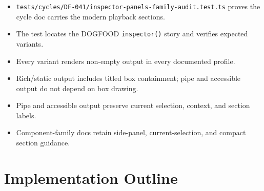 \begin{itemize}
\tightlist
\item
  \texttt{t\allowbreak{}e\allowbreak{}s\allowbreak{}t\allowbreak{}s\allowbreak{}/\allowbreak{}c\allowbreak{}y\allowbreak{}c\allowbreak{}l\allowbreak{}e\allowbreak{}s\allowbreak{}/\allowbreak{}D\allowbreak{}F\allowbreak{}-\allowbreak{}0\allowbreak{}4\allowbreak{}1\allowbreak{}/\allowbreak{}i\allowbreak{}n\allowbreak{}s\allowbreak{}p\allowbreak{}e\allowbreak{}c\allowbreak{}t\allowbreak{}o\allowbreak{}r\allowbreak{}-\allowbreak{}p\allowbreak{}a\allowbreak{}n\allowbreak{}e\allowbreak{}l\allowbreak{}s\allowbreak{}-\allowbreak{}f\allowbreak{}a\allowbreak{}m\allowbreak{}i\allowbreak{}l\allowbreak{}y\allowbreak{}-\allowbreak{}a\allowbreak{}u\allowbreak{}d\allowbreak{}i\allowbreak{}t\allowbreak{}.\allowbreak{}t\allowbreak{}e\allowbreak{}s\allowbreak{}t\allowbreak{}.\allowbreak{}t\allowbreak{}s} proves the cycle doc carries the modern playback sections.
\item
  The test locates the DOGFOOD \texttt{i\allowbreak{}n\allowbreak{}s\allowbreak{}p\allowbreak{}e\allowbreak{}c\allowbreak{}t\allowbreak{}o\allowbreak{}r\allowbreak{}(\allowbreak{})} story and verifies expected variants.
\item
  Every variant renders non-empty output in every documented profile.
\item
  Rich/static output includes titled box containment; pipe and accessible output do not depend on box drawing.
\item
  Pipe and accessible output preserve current selection, context, and section labels.
\item
  Component-family docs retain side-panel, current-selection, and compact section guidance.
\end{itemize}

\section{Implementation Outline}\label{record-095-implementation-outline}

